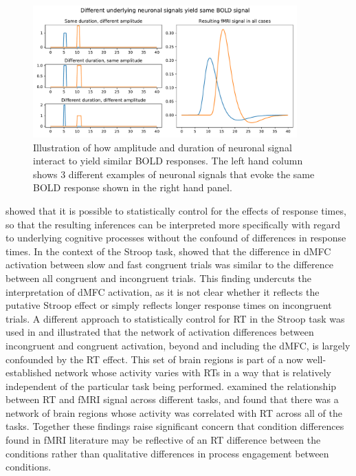 \documentclass[titlepage,12pt] {article}
\begin{document}
\begin{figure}[h!]
  \centering
   \includegraphics[width=4in]{Figures/neuron_same_bold.pdf}
   \caption{Illustration of how amplitude and duration of neuronal signal interact to yield similar BOLD responses.  The left hand column shows 3 different examples of neuronal signals that evoke the same BOLD response shown in the right hand panel.   }
  \label{fig:neuron_bold}
 \end{figure}

\citet{grinband_detection_2008} showed that it is possible to statistically control for the effects of response times, so that the resulting inferences can be interpreted more specifically with regard to underlying cognitive processes without the confound of differences in response times.  In the context of the Stroop task, \citet{grinband_dorsal_2011} showed that the difference in dMFC activation between slow and fast congruent trials was similar to the difference between all congruent and incongruent trials.  This finding undercuts the interpretation of dMFC activation, as it is not clear whether it reflects the putative Stroop effect or simply reflects longer response times on incongruent trials.  A different approach to statistically control for RT in the Stroop task was used in \citet{carp_conditional_2010} and illustrated that the network of activation differences between incongruent and congruent activation, beyond and including the dMFC, is largely confounded by the RT effect.  This set of brain regions is part of a now well-established network whose activity varies with RTs in a way that is relatively independent of the particular task being performed.  \citet{yarkoni_bold_2009} examined the relationship between RT and fMRI signal across different tasks, and found that there was a network of brain regions whose activity was correlated with RT across all of the tasks. Together these findings raise significant concern that condition differences found in fMRI literature may be reflective of an RT difference between the conditions rather than qualitative differences in process engagement between conditions.  
\end{document}
